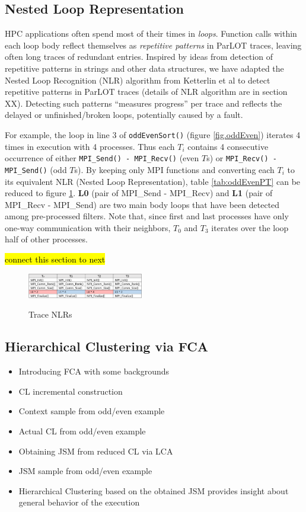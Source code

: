 \subsection{Nested Loop Representation}
HPC applications often spend most of their times in \textit{loops}. Function calls within each loop body reflect themselves as \textit{repetitive patterns} in ParLOT traces, leaving often long traces of redundant entries. 
Inspired by ideas from detection of repetitive patterns in strings \cite{nakamura_fast_2013} and other data structures\cite{kmr}, we have adapted the Nested Loop Recognition (NLR) algorithm from Ketterlin et al\cite{Ketterlin-nlr} to detect repetitive patterns in ParLOT traces (details of NLR algorithm are in section XX). Detecting such patterns ``measures progress'' per trace and reflects the delayed or unfinished/broken loops, potentially caused by a fault.

For example, the loop in line 3 of \texttt{oddEvenSort()} (figure \ref{fig.oddEven}) iterates 4 times in execution with 4 processes. Thus each $T_i$ contains 4 consecutive occurrence of either \texttt{MPI\_Send() - MPI\_Recv()} (even $T$s) or \texttt{MPI\_Recv() - MPI\_Send()} (odd $T$s). By keeping only MPI functions and converting each $T_i$ to its equivalent NLR (Nested Loop Representation), table \ref{tab:oddEvenPT} can be reduced to figure \ref{tab:oddEvenPT-r}. \textbf{L0} (pair of MPI\_Send - MPI\_Recv) and \textbf{L1} (pair of MPI\_Recv - MPI\_Send) are two main body loops that have been detected among pre-processed filters. Note that, since first and last processes have only one-way communication with their neighbors, $T_0$ and $T_3$ iterates over the loop half of other processes.

\hl{connect this section to next}

\begin{figure}[]
\centering
\caption{Trace NLRs}
\includegraphics[width=0.45\textwidth]{figs/oddEvenPT-r.png}
\label{tab:oddEvenPT-r}
\end{figure}


\subsection{Hierarchical Clustering via FCA}
\begin{itemize}
	\item Introducing FCA with some backgrounds
	\item CL incremental construction
	\item Context sample from odd/even example 
	\item Actual CL from odd/even example
	\item Obtaining JSM from reduced CL via LCA
	\item JSM sample from odd/even example
	\item Hierarchical Clustering based on the obtained JSM provides insight about general behavior of the execution 
\end{itemize}



